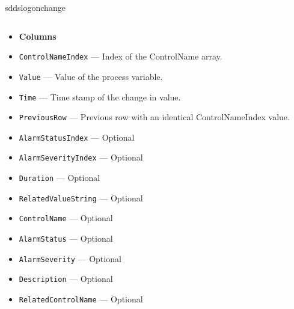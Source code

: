 \begin{sddsprog}{sddslogonchange}
\begin{itemize}
\begin{verbatim}
\end{verbatim}
\begin{itemize}
        \item {\bf Columns}
        \item {\tt ControlNameIndex} --- Index of the ControlName array.
        \item {\tt Value} --- Value of the process variable.
        \item {\tt Time} --- Time stamp of the change in value.
        \item {\tt PreviousRow} --- Previous row with an identical ControlNameIndex value.
        \item {\tt AlarmStatusIndex} --- Optional
        \item {\tt AlarmSeverityIndex} --- Optional
        \item {\tt Duration} --- Optional
        \item {\tt RelatedValueString} --- Optional
        \item {\tt ControlName} --- Optional
        \item {\tt AlarmStatus} --- Optional
        \item {\tt AlarmSeverity} --- Optional
        \item {\tt Description} --- Optional
        \item {\tt RelatedControlName} --- Optional

\end{itemize}

\end{itemize}


\end{sddsprog}
